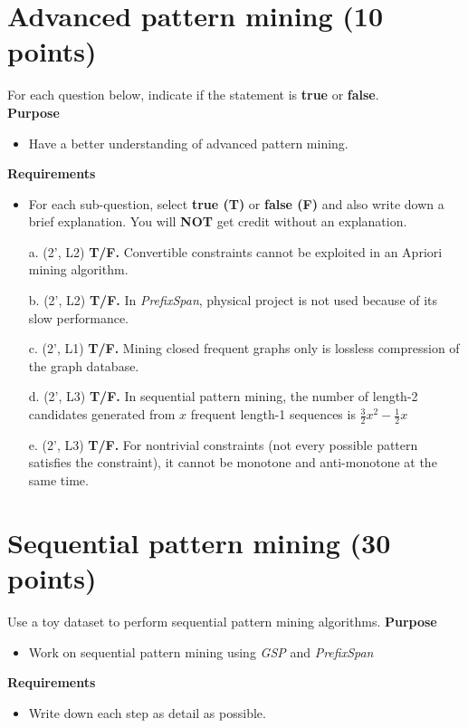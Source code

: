 \section{Advanced pattern mining (10 points)}
For each question below, indicate if the statement is \textbf{true} or \textbf{false}.\\
\textbf{Purpose} 
\begin{itemize}\vspace{-2mm}\setlength\itemsep{-1mm}
\item Have a better understanding of advanced pattern mining.
\end{itemize}
\textbf{Requirements}
\begin{itemize}\vspace{-2mm}\setlength\itemsep{-1mm}
\item For each sub-question, select \textbf{true (T)} or \textbf{false (F)} and also write down a brief explanation. You will \textbf{NOT} get credit without an explanation. 
\end{itemize}
\begin{itemize}
    \item[a.] (2', L2) \textbf{T/F.}  Convertible constraints cannot be exploited in an Apriori mining algorithm.
    \item[b.] (2', L2) \textbf{T/F.}  In \textit{PrefixSpan}, physical project is not used because of its slow performance.
    \item[c.] (2', L1) \textbf{T/F.}  Mining closed frequent graphs only is lossless compression of the graph database.
    \item[d.] (2', L3) \textbf{T/F.}  In sequential pattern mining, the number of length-2 candidates generated from $x$ frequent length-1 sequences is $\frac{3}{2}x^2 - \frac{1}{2}x$
    \item[e.] (2', L3) \textbf{T/F.}  For nontrivial constraints (not every possible pattern satisfies the constraint), it cannot be monotone and anti-monotone at the same time.
\end{itemize}



\section{Sequential pattern mining (30 points)}
Use a toy dataset to perform sequential pattern mining algorithms.
\textbf{Purpose} 
\begin{itemize}\vspace{-2mm}\setlength\itemsep{-1mm}
\item Work on sequential pattern mining using \textit{GSP} and \textit{PrefixSpan}
\end{itemize}
\textbf{Requirements}
\begin{itemize}\vspace{-2mm}\setlength\itemsep{-1mm}
\item Write down each step as detail as possible.
\end{itemize}

